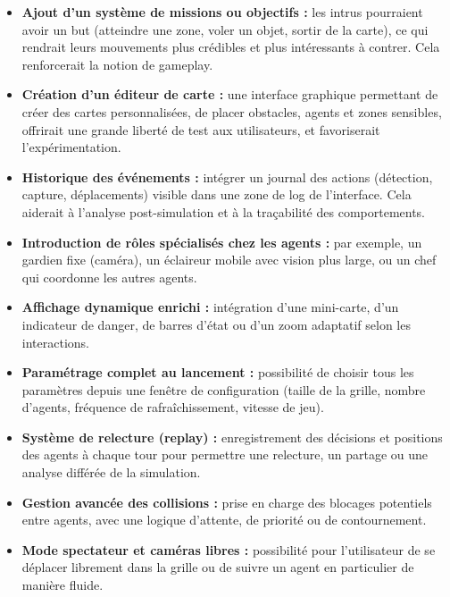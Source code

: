 \begin{itemize}
    \item \textbf{Ajout d’un système de missions ou objectifs :} les intrus pourraient avoir un but (atteindre une zone, voler un objet, sortir de la carte), ce qui rendrait leurs mouvements plus crédibles et plus intéressants à contrer. Cela renforcerait la notion de gameplay.
    
    \item \textbf{Création d’un éditeur de carte :} une interface graphique permettant de créer des cartes personnalisées, de placer obstacles, agents et zones sensibles, offrirait une grande liberté de test aux utilisateurs, et favoriserait l’expérimentation.
    
    \item \textbf{Historique des événements :} intégrer un journal des actions (détection, capture, déplacements) visible dans une zone de log de l’interface. Cela aiderait à l’analyse post-simulation et à la traçabilité des comportements.
    
    \item \textbf{Introduction de rôles spécialisés chez les agents :} par exemple, un gardien fixe (caméra), un éclaireur mobile avec vision plus large, ou un chef qui coordonne les autres agents.
     \item \textbf{Affichage dynamique enrichi :} intégration d’une mini-carte, d’un indicateur de danger, de barres d’état ou d’un zoom adaptatif selon les interactions.

    \item \textbf{Paramétrage complet au lancement :} possibilité de choisir tous les paramètres depuis une fenêtre de configuration (taille de la grille, nombre d’agents, fréquence de rafraîchissement, vitesse de jeu).

    \item \textbf{Système de relecture (replay) :} enregistrement des décisions et positions des agents à chaque tour pour permettre une relecture, un partage ou une analyse différée de la simulation.

    \item \textbf{Gestion avancée des collisions :} prise en charge des blocages potentiels entre agents, avec une logique d’attente, de priorité ou de contournement.

    \item \textbf{Mode spectateur et caméras libres :} possibilité pour l’utilisateur de se déplacer librement dans la grille ou de suivre un agent en particulier de manière fluide.
\end{itemize}


